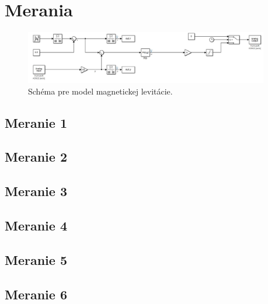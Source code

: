 \documentclass{article}
\begin{document}

\section{Merania}
\label{sec:merania}

\begin{figure}[!htbp]
	\begin{center}
		\includegraphics[width=0.95\textwidth]{include/schema.png}
	\end{center}
	\caption{Schéma pre model magnetickej levitácie.}
	\label{fig:schema}
\end{figure}


\subsection{Meranie 1}
\label{sec:meranie1}

\subsection{Meranie 2}
\label{sec:meranie2}

\subsection{Meranie 3}
\label{sec:meranie3}

\subsection{Meranie 4}
\label{sec:meranie4}

\subsection{Meranie 5}
\label{sec:meranie5}

\subsection{Meranie 6}
\label{sec:meranie6}
\end{document}
